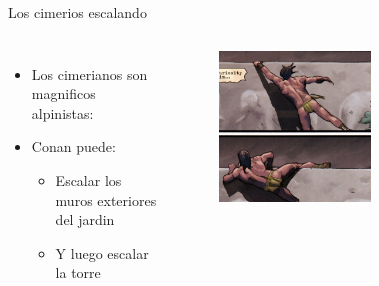 \begin{frame}{Los cimerios escalando}
  \begin{columns}
    \begin{itemize}
      \item Los cimerianos son magnificos alpinistas:
      \item Conan puede:
      \begin{itemize}
        \item Escalar los muros exteriores del jardin
        \item Y luego escalar la torre
      \end{itemize}
    \end{itemize}
    \begin{figure}[htb]
      \centering
      \includegraphics[width=0.6\textwidth]{img/tropes/escalando}
    \end{figure} 
  \end{columns}
\end{frame}

